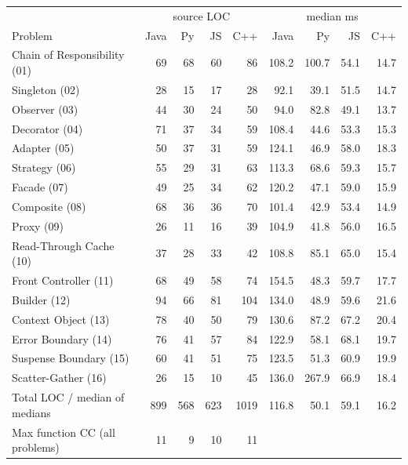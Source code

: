 \documentclass[11pt,a4paper]{article}
\begin{document}
\begin{longtable}{@{}p{4.6cm}rrrrrrrr@{}}\toprule
& \multicolumn{4}{c}{source LOC} & \multicolumn{4}{c}{median ms}\\
Problem & Java & Py & JS & C++ & Java & Py & JS & C++\\\midrule\endhead
Chain of Responsibility (01) & 69 & 68 & 60 & 86 & 108.2 & 100.7 & 54.1 & 14.7\\
Singleton (02) & 28 & 15 & 17 & 28 & 92.1 & 39.1 & 51.5 & 14.7\\
Observer (03) & 44 & 30 & 24 & 50 & 94.0 & 82.8 & 49.1 & 13.7\\
Decorator (04) & 71 & 37 & 34 & 59 & 108.4 & 44.6 & 53.3 & 15.3\\
Adapter (05) & 50 & 37 & 31 & 59 & 124.1 & 46.9 & 58.0 & 18.3\\
Strategy (06) & 55 & 29 & 31 & 63 & 113.3 & 68.6 & 59.3 & 15.7\\
Facade (07) & 49 & 25 & 34 & 62 & 120.2 & 47.1 & 59.0 & 15.9\\
Composite (08) & 68 & 36 & 36 & 70 & 101.4 & 42.9 & 53.4 & 14.9\\
Proxy (09) & 26 & 11 & 16 & 39 & 104.9 & 41.8 & 56.0 & 16.5\\
Read-Through Cache (10) & 37 & 28 & 33 & 42 & 108.8 & 85.1 & 65.0 & 15.4\\
Front Controller (11) & 68 & 49 & 58 & 74 & 154.5 & 48.3 & 59.7 & 17.7\\
Builder (12) & 94 & 66 & 81 & 104 & 134.0 & 48.9 & 59.6 & 21.6\\
Context Object (13) & 78 & 40 & 50 & 79 & 130.6 & 87.2 & 67.2 & 20.4\\
Error Boundary (14) & 76 & 41 & 57 & 84 & 122.9 & 58.1 & 68.1 & 19.7\\
Suspense Boundary (15) & 60 & 41 & 51 & 75 & 123.5 & 51.3 & 60.9 & 19.9\\
Scatter-Gather (16) & 26 & 15 & 10 & 45 & 136.0 & 267.9 & 66.9 & 18.4\\
\midrule Total LOC / median of medians & 899 & 568 & 623 & 1019 & 116.8 & 50.1 & 59.1 & 16.2\\
Max function CC (all problems) & 11 & 9 & 10 & 11 & & & & \\\bottomrule\end{longtable}
\end{document}
